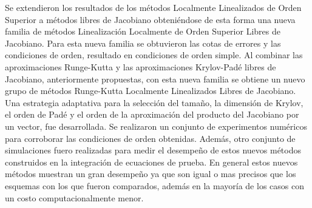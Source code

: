 \begin{conclusions}
    Se extendieron los resultados de los métodos Localmente Linealizados de Orden Superior a métodos libres de Jacobiano obteniéndose de esta forma una nueva familia de métodos Linealización Localmente de Orden Superior Libres de Jacobiano. Para esta nueva familia se obtuvieron las cotas de errores y las condiciones de orden, resultado en condiciones de orden simple. Al combinar las aproximaciones Runge-Kutta y las aproximaciones Krylov-Padé libres de Jacobiano, anteriormente propuestas, con esta nueva familia se obtiene un nuevo grupo de métodos  Runge-Kutta Localmente Linealizados Libres de Jacobiano. Una estrategia adaptativa para la selección del tamaño, la dimensión de Krylov, el orden de Padé y el orden de la aproximación del producto del Jacobiano por un vector, fue desarrollada. Se realizaron un conjunto de experimentos numéricos para corroborar las condiciones de orden obtenidas. Además, otro conjunto de simulaciones fuero realizadas para medir el desempeño de estos nuevos métodos construidos en la integración de ecuaciones de prueba. En general estos nuevos métodos muestran un gran desempeño ya que son igual o mas precisos que los esquemas con los que fueron comparados, además en la mayoría de los casos con un costo computacionalmente menor.



\end{conclusions}
